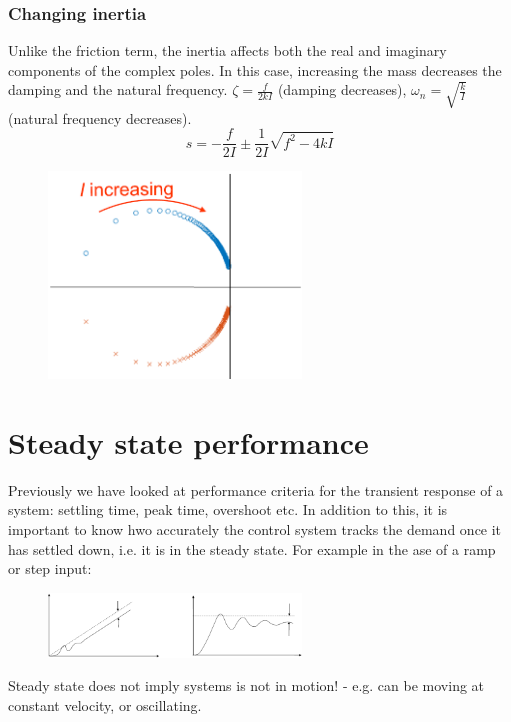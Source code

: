 \documentclass[class=report, crop=false, 12pt,a4paper]{standalone}
\begin{document}
\subsubsection{Changing inertia}
Unlike the friction term, the inertia affects both the real and imaginary components of the complex poles. In this case, increasing the mass decreases the damping and the natural frequency. $\zeta = \frac{f}{2kI}$ (damping decreases), $\omega_n = \sqrt{\frac{k}{I}}$ (natural frequency decreases).
\begin{equation}
  s = - \frac{f}{2I} \pm \frac{1}{2I}\sqrt{f^2 - 4kI}
\end{equation}
\begin{figure}[H]
  \centerline{\includegraphics[width = 0.6\textwidth]{../img/diagram100.png}}
  \caption{}
\end{figure}
\section{Steady state performance}
Previously we have looked at performance criteria for the transient response of a system: settling time, peak time, overshoot etc. In addition to this, it is important to know hwo accurately the control system tracks the demand once it has settled down, i.e. it is in the steady state. For example in the ase of a ramp or step input:
\begin{figure}[H]
  \centerline{\includegraphics[width = 0.6\textwidth]{../img/diagram101.png}}
  \caption{}
\end{figure}
Steady state does not imply systems is not in motion! - e.g. can be moving at constant velocity, or oscillating.
\end{document}
